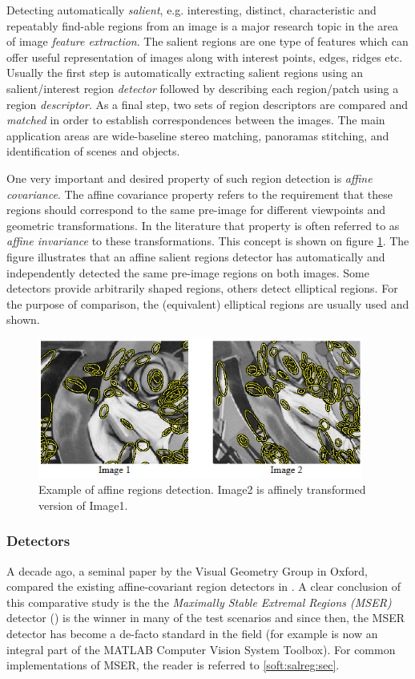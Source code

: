 Detecting automatically {\em salient}, e.g.  interesting, distinct, characteristic and repeatably find-able regions from an image is a major research topic in the area of image {\em feature extraction}. The salient regions are one type of features which can offer useful representation of images along with interest points, edges, ridges etc. Usually the first step is automatically extracting salient regions using an salient/interest region {\em detector} followed by describing each region/patch using a region {\em descriptor}. As a final step, two sets of region descriptors are compared and {\em matched} in order to establish correspondences between the images. The main application areas are wide-baseline stereo matching, panoramas stitching,  and identification of scenes and objects. 

One very important and desired property of such region detection is {\em affine covariance}.  The affine covariance property refers to the requirement that these regions should correspond to the same pre-image for different viewpoints and geometric transformations. In the literature that property is often referred to as {\em affine invariance} to these transformations. 
This concept is shown on figure \ref{fig:affreg}. The figure illustrates that an affine salient regions detector has automatically and independently detected the same pre-image regions on both images. Some detectors provide arbitrarily shaped regions, others detect elliptical regions. For the purpose of comparison, the (equivalent) elliptical regions are usually used and shown.
\begin{figure}[H]
\begin{center}
\includegraphics[width=0.95\textwidth]{fig/AffineRegions}
\end{center}
\caption{Example of affine regions detection. Image2 is affinely transformed version of Image1.}
\label{fig:affreg}
\end{figure}

\subsubsection{Detectors}
A decade ago, a seminal paper by the Visual Geometry Group in Oxford, compared the existing affine-covariant region detectors in \cite{Mikolajczyk:2005}. A clear conclusion of this comparative study is the the  {\em  Maximally Stable Extremal Regions (MSER)} detector (\cite{Matas2002BMVC}) is the winner in many of the test scenarios and since then, the MSER detector has become a de-facto standard in the field (for example is now an integral part of the MATLAB Computer Vision System Toolbox). For common implementations of MSER, the reader is referred to \ref{soft:salreg:sec}.

